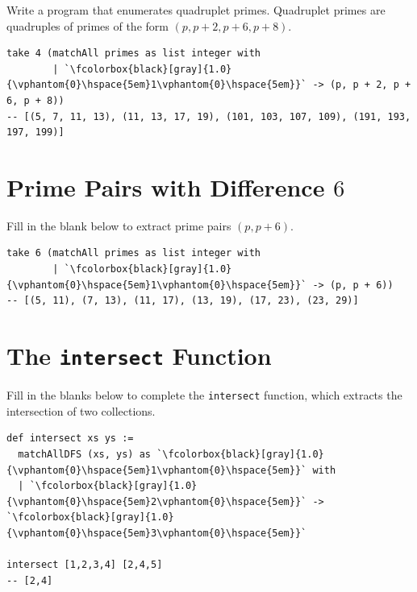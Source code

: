 Write a program that enumerates quadruplet primes.
Quadruplet primes are quadruples of primes of the form $(p,p + 2,p + 6,p + 8)$.

\begin{lstlisting}[language=egison]
take 4 (matchAll primes as list integer with
        | `\fcolorbox{black}[gray]{1.0}{\vphantom{0}\hspace{5em}1\vphantom{0}\hspace{5em}}` -> (p, p + 2, p + 6, p + 8))
-- [(5, 7, 11, 13), (11, 13, 17, 19), (101, 103, 107, 109), (191, 193, 197, 199)]
\end{lstlisting}

\section*{Prime Pairs with Difference $6$}

Fill in the blank below to extract prime pairs $(p, p+6)$.

\begin{lstlisting}[language=egison]
take 6 (matchAll primes as list integer with
        | `\fcolorbox{black}[gray]{1.0}{\vphantom{0}\hspace{5em}1\vphantom{0}\hspace{5em}}` -> (p, p + 6))
-- [(5, 11), (7, 13), (11, 17), (13, 19), (17, 23), (23, 29)]
\end{lstlisting}

\section*{The \texttt{intersect} Function}

Fill in the blanks below to complete the \lstinline{intersect} function, which extracts the intersection of two collections.

\begin{lstlisting}[language=egison]
def intersect xs ys :=
  matchAllDFS (xs, ys) as `\fcolorbox{black}[gray]{1.0}{\vphantom{0}\hspace{5em}1\vphantom{0}\hspace{5em}}` with
  | `\fcolorbox{black}[gray]{1.0}{\vphantom{0}\hspace{5em}2\vphantom{0}\hspace{5em}}` -> `\fcolorbox{black}[gray]{1.0}{\vphantom{0}\hspace{5em}3\vphantom{0}\hspace{5em}}`

intersect [1,2,3,4] [2,4,5]
-- [2,4]
\end{lstlisting}

